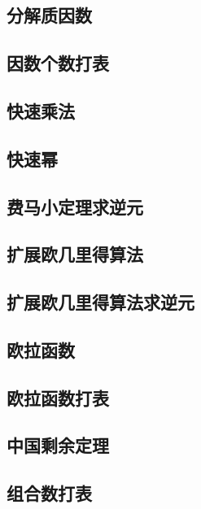 \documentclass[a4paper, 12pt]{article}
\begin{document}
\subsection{分解质因数}

\subsection{因数个数打表}

\subsection{快速乘法}

\subsection{快速幂}

\subsection{费马小定理求逆元}

\subsection{扩展欧几里得算法}

\subsection{扩展欧几里得算法求逆元}

\subsection{欧拉函数}

\subsection{欧拉函数打表}

\subsection{中国剩余定理}

\subsection{组合数打表}

\end{document}
